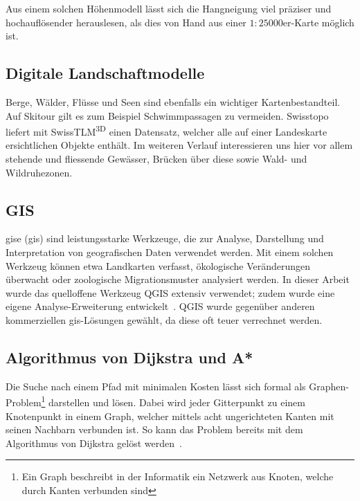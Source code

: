 Aus einem solchen Höhenmodell lässt sich die Hangneigung viel präziser und hochauflösender herauslesen, als dies von Hand aus einer $1:25000$er-Karte möglich ist.

\subsection{Digitale Landschaftmodelle}

Berge, Wälder, Flüsse und Seen sind ebenfalls ein wichtiger Kartenbestandteil. Auf Skitour gilt es zum Beispiel Schwimmpassagen zu vermeiden. Swisstopo liefert mit SwissTLM\textsuperscript{3D} einen Datensatz, welcher alle auf einer Landeskarte ersichtlichen Objekte enthält. Im weiteren Verlauf interessieren uns hier vor allem stehende und fliessende Gewässer, Brücken über diese sowie Wald- und Wildruhezonen.

\subsection{GIS}\label{sec:gis}

\acrlong{gis}e (\acrshort{gis}) sind leistungsstarke Werkzeuge, die zur Analyse, Darstellung und Interpretation von geografischen Daten verwendet werden. Mit einem solchen Werkzeug können etwa Landkarten verfasst, ökologische Veränderungen überwacht oder zoologische Migrationsmuster analysiert werden.
In dieser Arbeit wurde das quelloffene Werkzeug QGIS extensiv verwendet; zudem wurde eine eigene Analyse-Erweiterung entwickelt~\cite{qgis}. QGIS wurde gegenüber anderen kommerziellen \gls{gis}-Lösungen gewählt, da diese oft teuer verrechnet werden.

\subsection{Algorithmus von Dijkstra und A*}

Die Suche nach einem Pfad mit minimalen Kosten lässt sich formal als Graphen-Problem\footnote{Ein Graph beschreibt in der Informatik ein Netzwerk aus Knoten, welche durch Kanten verbunden sind} darstellen und lösen. Dabei wird jeder Gitterpunkt zu einem Knotenpunkt in einem Graph, welcher mittels acht ungerichteten Kanten mit seinen Nachbarn verbunden ist. So kann das Problem bereits mit dem Algorithmus von Dijkstra gelöst werden~\cite{dijkstra1959note}.

